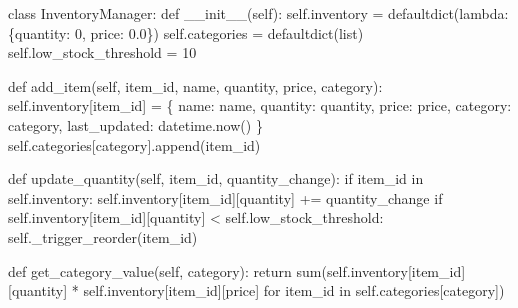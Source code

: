 \documentclass[
  letterpaper,
  DIV=11,
  numbers=noendperiod,
  oneside]{scrreprt}
\newenvironment{Shaded}{}{}
\newcommand{\BuiltInTok}[1]{\textcolor[rgb]{0.84,0.23,0.29}{#1}}
\newcommand{\ControlFlowTok}[1]{\textcolor[rgb]{0.84,0.23,0.29}{#1}}
\newcommand{\DecValTok}[1]{\textcolor[rgb]{0.00,0.36,0.77}{#1}}
\newcommand{\FloatTok}[1]{\textcolor[rgb]{0.00,0.36,0.77}{#1}}
\newcommand{\FunctionTok}[1]{\textcolor[rgb]{0.44,0.26,0.76}{#1}}
\newcommand{\KeywordTok}[1]{\textcolor[rgb]{0.84,0.23,0.29}{#1}}
\newcommand{\NormalTok}[1]{\textcolor[rgb]{0.14,0.16,0.18}{#1}}
\newcommand{\OperatorTok}[1]{\textcolor[rgb]{0.14,0.16,0.18}{#1}}
\newcommand{\StringTok}[1]{\textcolor[rgb]{0.01,0.18,0.38}{#1}}
\newcommand{\VariableTok}[1]{\textcolor[rgb]{0.89,0.38,0.04}{#1}}
\begin{document}
\begin{Shaded}
\begin{Highlighting}[]
\KeywordTok{class}\NormalTok{ InventoryManager:}
    \KeywordTok{def} \FunctionTok{\_\_init\_\_}\NormalTok{(}\VariableTok{self}\NormalTok{):}
        \VariableTok{self}\NormalTok{.inventory }\OperatorTok{=}\NormalTok{ defaultdict(}\KeywordTok{lambda}\NormalTok{: \{}\StringTok{\textquotesingle{}quantity\textquotesingle{}}\NormalTok{: }\DecValTok{0}\NormalTok{, }\StringTok{\textquotesingle{}price\textquotesingle{}}\NormalTok{: }\FloatTok{0.0}\NormalTok{\})}
        \VariableTok{self}\NormalTok{.categories }\OperatorTok{=}\NormalTok{ defaultdict(}\BuiltInTok{list}\NormalTok{)}
        \VariableTok{self}\NormalTok{.low\_stock\_threshold }\OperatorTok{=} \DecValTok{10}
    
    \KeywordTok{def}\NormalTok{ add\_item(}\VariableTok{self}\NormalTok{, item\_id, name, quantity, price, category):}
        \VariableTok{self}\NormalTok{.inventory[item\_id] }\OperatorTok{=}\NormalTok{ \{}
            \StringTok{\textquotesingle{}name\textquotesingle{}}\NormalTok{: name,}
            \StringTok{\textquotesingle{}quantity\textquotesingle{}}\NormalTok{: quantity,}
            \StringTok{\textquotesingle{}price\textquotesingle{}}\NormalTok{: price,}
            \StringTok{\textquotesingle{}category\textquotesingle{}}\NormalTok{: category,}
            \StringTok{\textquotesingle{}last\_updated\textquotesingle{}}\NormalTok{: datetime.now()}
\NormalTok{        \}}
        \VariableTok{self}\NormalTok{.categories[category].append(item\_id)}
    
    \KeywordTok{def}\NormalTok{ update\_quantity(}\VariableTok{self}\NormalTok{, item\_id, quantity\_change):}
        \ControlFlowTok{if}\NormalTok{ item\_id }\KeywordTok{in} \VariableTok{self}\NormalTok{.inventory:}
            \VariableTok{self}\NormalTok{.inventory[item\_id][}\StringTok{\textquotesingle{}quantity\textquotesingle{}}\NormalTok{] }\OperatorTok{+=}\NormalTok{ quantity\_change}
            \ControlFlowTok{if} \VariableTok{self}\NormalTok{.inventory[item\_id][}\StringTok{\textquotesingle{}quantity\textquotesingle{}}\NormalTok{] }\OperatorTok{\textless{}} \VariableTok{self}\NormalTok{.low\_stock\_threshold:}
                \VariableTok{self}\NormalTok{.\_trigger\_reorder(item\_id)}
    
    \KeywordTok{def}\NormalTok{ get\_category\_value(}\VariableTok{self}\NormalTok{, category):}
        \ControlFlowTok{return} \BuiltInTok{sum}\NormalTok{(}\VariableTok{self}\NormalTok{.inventory[item\_id][}\StringTok{\textquotesingle{}quantity\textquotesingle{}}\NormalTok{] }\OperatorTok{*} 
                  \VariableTok{self}\NormalTok{.inventory[item\_id][}\StringTok{\textquotesingle{}price\textquotesingle{}}\NormalTok{] }
                  \ControlFlowTok{for}\NormalTok{ item\_id }\KeywordTok{in} \VariableTok{self}\NormalTok{.categories[category])}
\end{Highlighting}
\end{Shaded}
\end{document}
